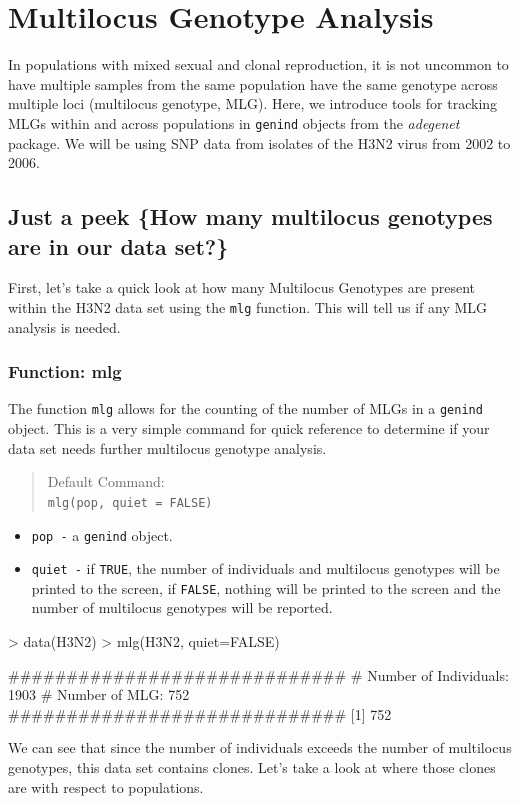 \documentclass[letterpaper]{article}
\newcommand{\tab}{\hspace*{1em}}
\begin{document}
\section{Multilocus Genotype Analysis}\label{mlg}

\tab\tab In populations with mixed sexual and clonal reproduction, it is not uncommon to have multiple samples from the same population have the same genotype across multiple loci (multilocus genotype, MLG). Here, we introduce tools for tracking MLGs within and across populations in \texttt{genind} objects from the \textit{adegenet} package. We will be using SNP data from isolates of the H3N2 virus from 2002 to 2006.
\subsection{Just a peek \{How many multilocus genotypes are in our data set?\}}\label{mlg:mlg}

\tab\tab First, let's take a quick look at how many Multilocus Genotypes are present within the H3N2 data set using the \texttt{mlg} function. This will tell us if any MLG analysis is needed.
\subsubsection{Function: mlg}\label{mlg:mlg:mlg}

\tab\tab The function \texttt{mlg} allows for the counting of the number of MLGs in a \texttt{genind} object. This is a very simple command for quick reference to determine if your data set needs further multilocus genotype analysis.
\begin{quote}
Default Command:\\
\texttt{mlg(pop, quiet = FALSE)}
\end{quote}
  \begin{itemize}
    \item \texttt{pop -} a \texttt{genind} object.
    \item \texttt{quiet -} if \texttt{TRUE}, the number of individuals and multilocus genotypes will be printed to the screen, if \texttt{FALSE}, nothing will be printed to the screen and the number of multilocus genotypes will be reported.
  \end{itemize}
\begin{Schunk}
\begin{Sinput}
> data(H3N2)
> mlg(H3N2, quiet=FALSE)
\end{Sinput}
\begin{Soutput}
#############################
# Number of Individuals: 1903 
# Number of MLG: 752 
#############################
[1] 752
\end{Soutput}
\end{Schunk}
We can see that since the number of individuals exceeds the number of multilocus genotypes, this data set contains clones. Let's take a look at where those clones are with respect to populations.
\end{document}
